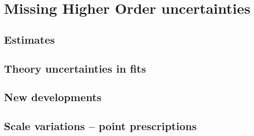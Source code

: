 
\chapter{Missing Higher Order uncertainties}
\label{ch:mhou}
\minitoc
\adjustmtc



\section{Estimates}
\label{sec:mhou/estimates}


\section{Theory uncertainties in \pdf fits}
\label{sec:mhou/pdf}


\section{New developments}
\label{sec:mhou/new}


\section{Scale variations -- point prescriptions}
\label{sec:mhou/prescriptions}


